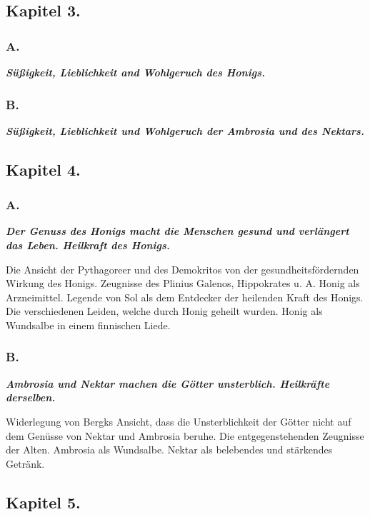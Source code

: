 \documentclass[a4paper, 11pt, oneside]{article}
\begin{document}
\subsection*{Kapitel 3.}

\subsubsection*{A.}

\textbf{\emph{Süßigkeit, Lieblichkeit and Wohlgeruch des Honigs.}}

\subsubsection*{B.}

\textbf{\emph{Süßigkeit, Lieblichkeit und Wohlgeruch der Ambrosia und des Nektars.}}

\subsection*{Kapitel 4.}

\subsubsection*{A.}

\textbf{\emph{Der Genuss des Honigs macht die Menschen gesund und verlängert das Leben. Heilkraft des Honigs.}}

Die Ansicht der Pythagoreer und des Demokritos von der gesundheitsfördernden Wirkung des Honigs. Zeugnisse des Plinius Galenos, Hippokrates u. A. Honig als Arzneimittel. Legende von Sol als dem Entdecker der heilenden Kraft des Honigs. Die verschiedenen Leiden, welche durch Honig geheilt wurden. Honig als Wundsalbe in einem finnischen Liede.

\subsubsection*{B.}

\textbf{\emph{Ambrosia und Nektar machen die Götter unsterblich. Heilkräfte derselben.}}

Widerlegung von Bergks Ansicht, dass die Unsterblichkeit der Götter nicht auf dem Genüsse von Nektar und Ambrosia beruhe. Die entgegenstehenden Zeugnisse der Alten. Ambrosia als Wundsalbe. Nektar als belebendes und stärkendes Getränk.

\subsection*{Kapitel 5.}
\end{document}
